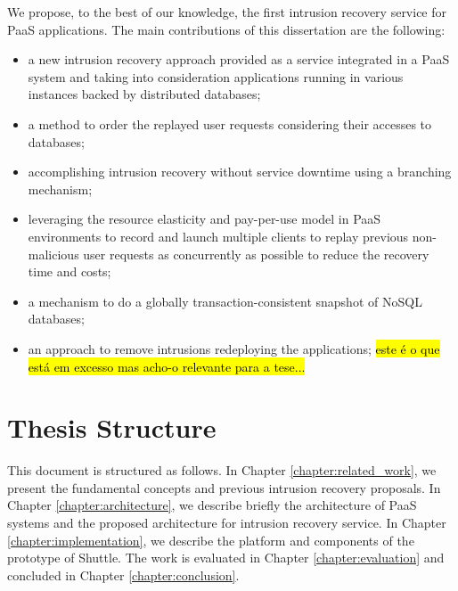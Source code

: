 We propose, to the best of our knowledge, the first intrusion recovery service for \ac{PaaS} applications. The main contributions of this dissertation are the following:
\begin{itemize}
\item a new intrusion recovery approach provided as a service integrated in a \ac{PaaS} system and taking into consideration applications running in various instances backed by distributed databases;
\item a method to order the replayed user requests considering their accesses to databases;
\item accomplishing intrusion recovery without service downtime using a branching mechanism;
\item leveraging the resource elasticity and pay-per-use model in \ac{PaaS} environments to record and launch multiple clients to replay previous non-malicious user requests as concurrently as possible to reduce the recovery time and costs;
\item a mechanism to do a globally transaction-consistent snapshot of \acs{NoSQL} databases;
\item an approach to remove intrusions redeploying the applications; \hl{este é o que está em excesso mas acho-o relevante para a tese...}
\end{itemize}

\section{Thesis Structure}\label{sec:introduction:structure}
This document is structured as follows. In Chapter \ref{chapter:related_work}, we present the fundamental concepts and previous intrusion recovery proposals. In Chapter \ref{chapter:architecture}, we describe briefly the architecture of \ac{PaaS} systems and the proposed architecture for intrusion recovery service. In Chapter \ref{chapter:implementation}, we describe the platform and components of the prototype of Shuttle. The work is evaluated in Chapter \ref{chapter:evaluation} and concluded in Chapter \ref{chapter:conclusion}.